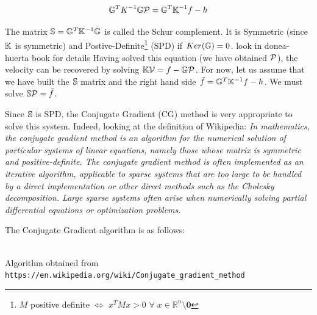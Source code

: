 \begin{mdframed}[backgroundcolor=blue!5]
\[
{\mathbb{G}}^T K^{-1} {\mathbb{G}} {\cal P} = {\mathbb{G}}^T {\mathbb{K}}^{-1} f - h 
\]
\end{mdframed}
The matrix ${\mathbb{S}}= {\mathbb{G}}^T {\mathbb{K}}^{-1} {\mathbb{G}} $ is called the Schur complement.  
It is Symmetric (since ${\mathbb{K}}$ is symmetric) and  Postive-Definite\footnote{$M$ 
positive definite $\iff$ $x^TMx>0$ $\forall \; x\in \mathbb{R}^n \setminus {\bm 0}$ }
(SPD)  if $Ker({{\mathbb{G}}})=0$. 
{\color{red} look in donea-huerta book for details}
Having solved this equation (we have obtained ${\cal P}$), the velocity can be recovered by solving 
${\mathbb{K}} {\cal V} =f- {\mathbb{G}} {\cal P}$. 
For now, let us assume that we have built the ${\mathbb{S}}$ matrix and the right hand side $\tilde{f}={\mathbb{G}}^T {\mathbb{K}}^{-1} f - h$.
We must solve ${\mathbb{S}} {\cal P} = \tilde{f}$.

 
Since ${\mathbb{S}}$ is SPD, the Conjugate Gradient (CG) method is very appropriate to solve this system. 
Indeed, looking at the definition of Wikipedia: {\it In mathematics, the conjugate gradient method is an algorithm for the numerical solution of particular systems of linear equations, namely those whose matrix is symmetric and positive-definite. The conjugate gradient method is often implemented as an iterative algorithm, applicable to sparse systems that are too large to be handled by a direct implementation or other direct methods such as the Cholesky decomposition. Large sparse systems often arise when numerically solving partial differential equations or optimization problems.}

The Conjugate Gradient algorithm is as follows:

\begin{center}
\\
Algorithm obtained from {\tt https://en.wikipedia.org/wiki/Conjugate\_gradient\_method}
\end{center}

